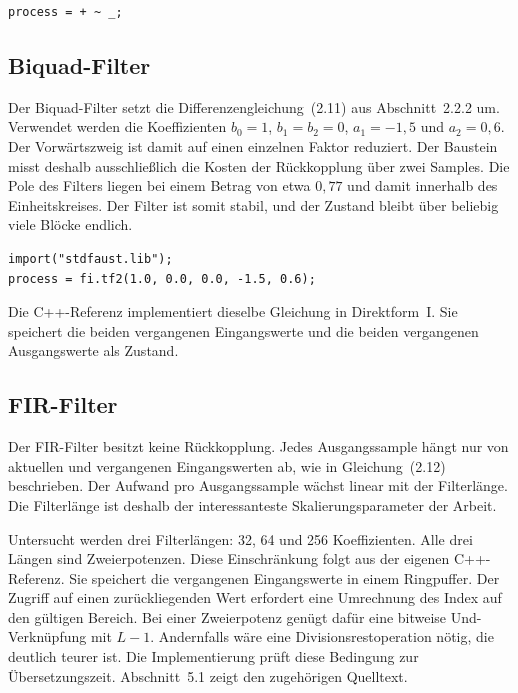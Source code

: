 \begin{program}
\caption{Faust-Beschreibung des Akkumulators}
\label{prog:accum}
\begin{lstlisting}
process = + ~ _;
\end{lstlisting}
\end{program}


\subsection{Biquad-Filter}

Der Biquad-Filter setzt die Differenzengleichung~(2.11) aus
Abschnitt~2.2.2 um. Verwendet werden die Koeffizienten $b_0 = 1$,
$b_1 = b_2 = 0$, $a_1 = -1{,}5$ und $a_2 = 0{,}6$. Der Vorwärtszweig ist
damit auf einen einzelnen Faktor reduziert. Der Baustein misst deshalb
ausschließlich die Kosten der Rückkopplung über zwei Samples. Die Pole des
Filters liegen bei einem Betrag von etwa $0{,}77$ und damit innerhalb des
Einheitskreises. Der Filter ist somit stabil, und der Zustand bleibt über
beliebig viele Blöcke endlich.

\begin{program}
\caption{Faust-Beschreibung des Biquad-Filters}
\label{prog:biquad}
\begin{lstlisting}
import("stdfaust.lib");
process = fi.tf2(1.0, 0.0, 0.0, -1.5, 0.6);
\end{lstlisting}
\end{program}

Die C++-Referenz implementiert dieselbe Gleichung in Direktform~I. Sie
speichert die beiden vergangenen Eingangswerte und die beiden vergangenen
Ausgangswerte als Zustand.


\subsection{FIR-Filter}

Der FIR-Filter besitzt keine Rückkopplung. Jedes Ausgangssample hängt nur von
aktuellen und vergangenen Eingangswerten ab, wie in Gleichung~(2.12)
beschrieben. Der Aufwand pro Ausgangssample wächst linear mit der
Filterlänge. Die Filterlänge ist deshalb der interessanteste
Skalierungsparameter der Arbeit.

Untersucht werden drei Filterlängen: 32, 64 und 256 Koeffizienten. Alle drei
Längen sind Zweierpotenzen. Diese Einschränkung folgt aus der eigenen
C++-Referenz. Sie speichert die vergangenen Eingangswerte in einem
Ringpuffer. Der Zugriff auf einen zurückliegenden Wert erfordert eine
Umrechnung des Index auf den gültigen Bereich. Bei einer Zweierpotenz genügt
dafür eine bitweise Und-Verknüpfung mit $L-1$. Andernfalls wäre eine
Divisionsrestoperation nötig, die deutlich teurer ist. Die Implementierung
prüft diese Bedingung zur Übersetzungszeit. Abschnitt~5.1 zeigt den
zugehörigen Quelltext.

